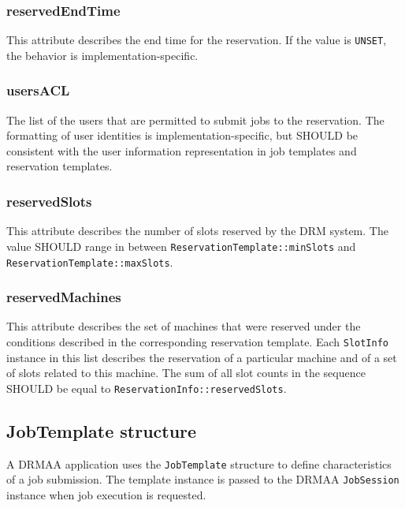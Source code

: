 \documentclass{article}
\newcommand{\h}[1]{\lstinline|#1|}
\newcommand{\rat}[1]{}
\begin{document}
\subsubsection{reservedEndTime}

This attribute describes the end time for the reservation. If the value is \h{UNSET}, the behavior is implementation-specific.

\rat{Mai 18th 2011 conf call rejected to treat UNSET as unrestricted end time (i.e. ``plus infinity'') here.}

\subsubsection{usersACL}

The list of the users that are permitted to submit jobs to the reservation. The formatting of user identities is implementation-specific, but SHOULD be consistent with the user information representation in job templates and reservation templates.

\subsubsection{reservedSlots}

This attribute describes the number of slots  reserved by the DRM system.
The value SHOULD range in between \h{ReservationTemplate::minSlots} and \h{ReservationTemplate::maxSlots}.

\subsubsection{reservedMachines}

This attribute describes the set of machines that were reserved under the conditions described in the corresponding reservation template. Each \h{SlotInfo} instance in this list describes the reservation of a particular machine and of a set of slots related to this machine. The sum of all slot counts in the sequence SHOULD be equal to \h{ReservationInfo::reservedSlots}.

\subsection{JobTemplate structure}
\label{sec:jobtemplate}

A DRMAA application uses the \h{JobTemplate} structure to define characteristics of a job submission. The template instance is passed to the DRMAA \h{JobSession} instance when job execution is requested.
\end{document}
